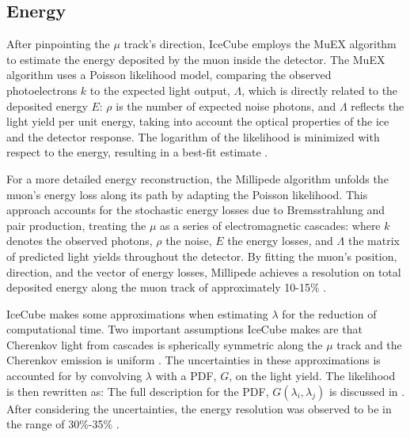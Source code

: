 \subsection{Energy}

After pinpointing the $\mu$ track's direction, IceCube employs the MuEX algorithm to estimate the energy deposited by the muon inside the detector.
The MuEX algorithm uses a Poisson likelihood model, comparing the observed photoelectrons $k$ to the expected light output, $\Lambda$, which is directly related to the deposited energy $E$:
\muEXLLH
$\rho$ is the number of expected noise photons, and $\Lambda$ reflects the light yield per unit energy, taking into account the optical properties of the ice and the detector response.
The logarithm of the likelihood is minimized with respect to the energy, resulting in a best-fit estimate \cite{IC3_energyReco}.

For a more detailed energy reconstruction, the Millipede algorithm unfolds the muon's energy loss along its path by adapting the Poisson likelihood.
This approach accounts for the stochastic energy losses due to Bremsstrahlung and pair production, treating the $\mu$ as a series of electromagnetic cascades:
\vecMULLH
where $k$ denotes the observed photons, $\rho$ the noise, $E$ the energy losses, and \textbf{$\Lambda$} the matrix of predicted light yields throughout the detector.
By fitting the muon's position, direction, and the vector of energy losses, Millipede achieves a resolution on total deposited energy along the muon track of approximately 10-15\% \cite{IC3_energyReco}.

IceCube makes some approximations when estimating $\lambda$ for the reduction of computational time.
Two important assumptions IceCube makes are that Cherenkov light from cascades is spherically symmetric along the $\mu$ track and the Cherenkov emission is uniform \cite{IC3_energyReco}.
The uncertainties in these approximations is accounted for by convolving $\lambda$ with a PDF, $G$, on the light yield.
The likelihood is then rewritten as:
\LLHwithspice
The full description for the PDF, $G(\lambda_i, \lambda_j)$ is discussed in \cite{IC3_energyReco}.
After considering the uncertainties, the energy resolution was observed to be in the range of 30\%-35\% \cite{IC3_energyReco}.

